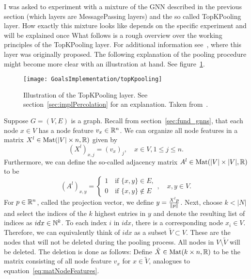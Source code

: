 \label{sec:implPercolation}
I was asked to experiment with a mixture of the GNN described in the previous section (which layers are MessagePassing layers) and the so called TopKPooling layer.
How exactly this mixture looks like depends on the specific experiment and will be explained once 
What follows is a rough overview over the working principles of the TopKPooling layer. 
For additional information see~\cite{topKPooling}, where this layer was originally proposed.
The following explanation of the pooling procedure might become more clear with
an illustration at hand. See figure~\ref{fig:topKPooling}.
\begin{figure}[h]
    \centering
    \texttt{[image: GoalsImplementation/topKpooling]}
    \caption{Illustration of the TopKPooling layer. See section~\ref{sec:implPercolation} for an explanation. Taken from~\cite{topKPooling}.}
    \label{fig:topKPooling}
\end{figure}
Suppose $G=(V,E)$ is a graph. Recall from section~\ref{sec:fund_gnns}, 
that each node $x\in V$ has a node feature $v_x\in\mathbb{R}^n$. We can organize all node
features in a matrix $X^l\in\text{Mat}(|V|\times n,\mathbb{R})$ given by
\begin{equation*}
    \left(X^l\right)_{x,j}=\left(v_x\right)_j, \quad x\in V, 1\leq j \leq n.
    \label{eq:matNodeFeatures}
\end{equation*}
Furthermore, we can define the so-called adjacency matrix $A^l\in\text{Mat}(|V|\times |V|,\mathbb{R})$ to be
\begin{equation*}
    \left(A^l\right)_{x,y}=\begin{cases}
        1 \quad \text{if } \{x,y\}\in E,\\
        0 \quad \text{if } \{x,y\}\notin E
    \end{cases}, \quad x,y\in V.
    \label{eq:matAdjacency}
\end{equation*}
For $p\in\mathbb{R}^n$, called the projection vector, we define $y=\frac{X^l p}{\lVert p\rVert}$. 
Next, choose $k<|N|$ and select the indices of the $k$ highest entries in $y$ and denote the resulting 
list of indices as $idx\in\mathbb{N}^k$. To each index $i$ in $idx$, there is a corresponding 
node $x_i\in V$. Therefore, we can equivalently think of $idx$ as a subset $\tilde{V}\subset V$. 
These are the nodes that will not be deleted during the pooling process. 
All nodes in $V\setminus\tilde{V}$ will be deleted. 
The deletion is done as follows: Define $\tilde{X}\in\text{Mat}(k\times n,\mathbb{R})$ to be the matrix
consisting of all node feature $v_x$ for $x\in\tilde{V}$, analogues to equation~\ref{eq:matNodeFeatures}. 
